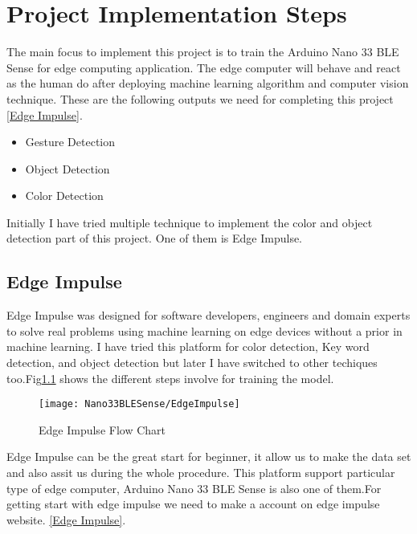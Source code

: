 %
%

\chapter{Project Implementation Steps}

The main focus to implement this project is to train the Arduino Nano 33 BLE Sense for edge computing application. The edge computer will behave and react as the human do after deploying machine learning algorithm and computer vision technique. These are the following outputs we need for completing this project \href{https://www.edgeimpulse.com/}{[Edge Impulse]}.

\begin{itemize}
	\item Gesture Detection
	\item Object Detection
	\item Color Detection
\end{itemize}

Initially I have tried multiple technique to implement the color and object detection part of this project. One of them is Edge Impulse.

\section{Edge Impulse}

Edge Impulse was designed for software developers, engineers and domain experts to solve real problems using machine learning on edge devices without a prior in machine learning. I have tried this platform for color detection, Key word detection, and object detection but later I have switched to other techiques too.Fig\ref{Edge Impulse Flow Chart} shows the different steps involve for training the model.  

\begin{figure}[h]
	\centering
	\texttt{[image: Nano33BLESense/EdgeImpulse]}
	\caption{Edge Impulse Flow Chart}
	\label{Edge Impulse Flow Chart}
\end{figure}

Edge Impulse can be the great start for beginner, it allow us to make the data set and also assit us during the whole procedure. This platform support particular type of edge computer, Arduino Nano 33 BLE Sense is also one of them.For getting start with edge impulse we need to make a account on edge impulse website. \href{https://www.edgeimpulse.com/}{[Edge Impulse]}.

